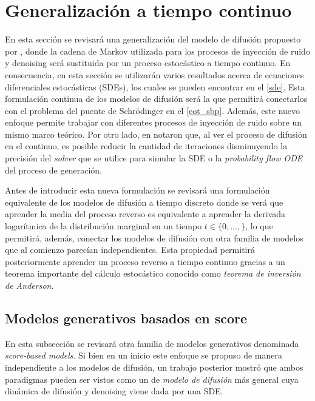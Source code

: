 \section{Generalización a tiempo continuo}
\label{dm/continuous_dm}

En esta sección se revisará una generalización del modelo de difusión propuesto por \cite{ho2020denoising}, donde la cadena de Markov utilizada para los procesos de inyección de ruido y denoising será sustituida por un proceso estocástico a tiempo continuo. En consecuencia, en esta sección se utilizarán varios resultados acerca de ecuaciones diferenciales estocásticas (SDEs), los cuales se pueden encontrar en el \autoref{sde}. Esta formulación continua de los modelos de difusión será la que permitirá conectarlos con el problema del puente de Schrödinger en el \autoref{eot_sbp}. Además, este nuevo enfoque permite trabajar con diferentes procesos de inyección de ruido sobre un mismo marco teórico. Por otro lado, en \cite{song2021scorebased} notaron que, al ver el proceso de difusión en el continuo, es posible reducir la cantidad de iteraciones disminuyendo la precisión del \textit{solver} que se utilice para simular la SDE o la \textit{probability flow ODE} del proceso de generación.

Antes de introducir esta nueva formulación se revisará una formulación equivalente de los modelos de difusión a tiempo discreto donde se verá que aprender la media del proceso reverso es equivalente a aprender la derivada logarítmica de la distribución marginal en un tiempo $t\in\{0,\ldots,\}$, lo que permitirá, además, conectar los modelos de difusión con otra familia de modelos que al comienzo parecían independientes. Esta propiedad permitirá posteriormente aprender un proceso reverso a tiempo continuo gracias a un teorema importante del cálculo estocástico conocido como \textit{teorema de inversión de Anderson}.

\subsection{Modelos generativos basados en score}
\label{dm/continuous_dm/score}

En esta subsección se revisará otra familia de modelos generativos denominada \textit{score-based models}. Si bien en un inicio este enfoque se propuso de manera independiente a los modelos de difusión, un trabajo posterior mostró que ambos paradigmas pueden ser vistos como un de \textit{modelo de difusión} más general cuya dinámica de difusión y denoising viene dada por una SDE.

